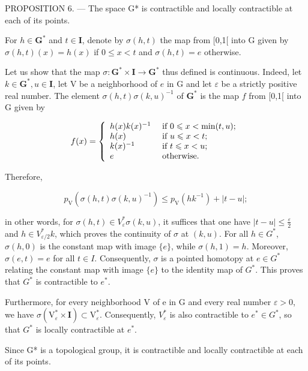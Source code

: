 PROPOSITION 6. --- The space G* is contractible and locally contractible at each of its points.

For \(h \in \mathbf{G}^*\) and \(t \in \mathbf{I}\), denote by \(\sigma(h, t)\) the map from [0,1[ into G given by \(\sigma(h, t)(x) = h(x)\) if \(0 \leqslant x < t\) and \(\sigma(h, t) = e\) otherwise.

Let us show that the map \(\sigma\colon\mathbf{G}^{*}\times\mathbf{I}\to\mathbf{G}^{*}\) thus defined is continuous. Indeed, let \(k\in\mathbf{G}^{*}, u\in\mathbf{I}\), let V be a neighborhood of \(e\) in G and let \(\varepsilon\) be a strictly positive real number. The element \(\sigma(h,t)\sigma(k,u)^{-1}\) of \(\mathbf{G}^{*}\) is the map \(f\) from [0,1[ into G given by

\[
f (x) = \left\{ \begin{array}{l l} h (x) k (x) ^ {- 1} & \text { if } 0 \leqslant x <   \min (t, u); \\ h (x) & \text { if } u \leqslant x <   t; \\ k (x) ^ {- 1} & \text { if } t \leqslant x <   u; \\ e & \text { otherwise. } \end{array} \right.
\]

Therefore,

\[
p _ {\mathrm{V}} (\sigma (h, t) \sigma (k, u) ^ {- 1}) \leqslant p _ {\mathrm{V}} (h k ^ {- 1}) + | t - u |;
\]

in other words, for \(\sigma(h,t) \in V_{\varepsilon}^{*}\sigma(k,u)\), it suffices that one have \(|t-u| \leqslant \frac{\varepsilon}{2}\) and \(h \in V_{\varepsilon/2}^{*}k\), which proves the continuity of \(\sigma\) at \((k,u)\). For all \(h \in G^{*}\), \(\sigma(h,0)\) is the constant map with image \(\{e\}\), while \(\sigma(h,1)=h\). Moreover, \(\sigma(e,t)=e\) for all \(t \in I\). Consequently, \(\sigma\) is a pointed homotopy at \(e \in G^{*}\) relating the constant map with image \(\{e\}\) to the identity map of \(G^{*}\). This proves that \(G^{*}\) is contractible to \(e^{*}\).

Furthermore, for every neighborhood V of e in G and every real number \(\varepsilon > 0\), we have \(\sigma(\mathrm{V}_{\varepsilon}^{*} \times \mathbf{I}) \subset \mathrm{V}_{\varepsilon}^{*}\). Consequently, \(V_{\varepsilon}^{*}\) is also contractible to \(e^{*} \in G^{*}\), so that \(G^{*}\) is locally contractible at \(e^{*}\).

Since G* is a topological group, it is contractible and locally contractible at each of its points.

